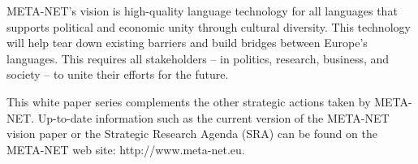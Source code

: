 \begin{multicols}{2}
META-NET’s vision is high-quality language technology for all languages that supports political and economic unity through cultural diversity. This technology will help tear down existing barriers and build bridges between Europe’s languages. This requires all stakeholders -- in politics, research, business, and society -- to unite their efforts for the future.

This white paper series complements the other strategic actions taken by META-NET. Up-to-date information such as the current version of the META-NET vision paper \cite{Meta1} or the Strategic Research Agenda (SRA) can be found on the META-NET web site: http://www.meta-net.eu.
\end{multicols}

\clearpage


